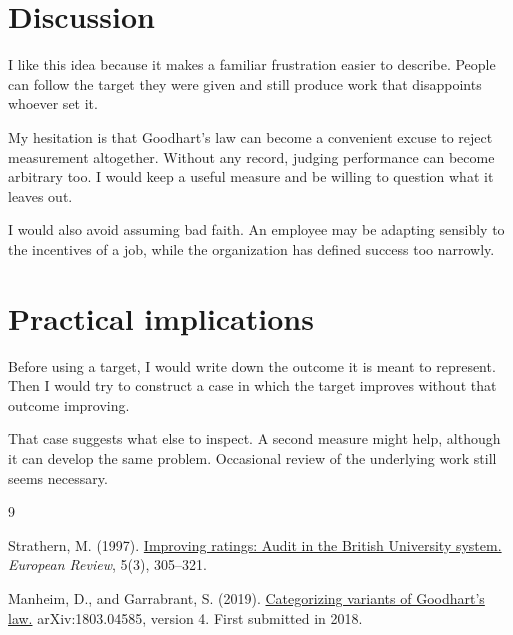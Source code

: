 \documentclass[11pt,a4paper]{article}
\begin{document}
\section{Discussion}

I like this idea because it makes a familiar frustration easier to
describe. People can follow the target they were given and still produce
work that disappoints whoever set it.

My hesitation is that Goodhart's law can become a convenient excuse to
reject measurement altogether. Without any record, judging performance
can become arbitrary too. I would keep a useful measure and be willing
to question what it leaves out.

I would also avoid assuming bad faith. An employee may be adapting
sensibly to the incentives of a job, while the organization has defined
success too narrowly.

\section{Practical implications}

Before using a target, I would write down the outcome it is meant to
represent. Then I would try to construct a case in which the target
improves without that outcome improving.

That case suggests what else to inspect. A second measure might help,
although it can develop the same problem. Occasional review of the
underlying work still seems necessary.

\renewcommand{\refname}{References}
\begin{thebibliography}{9}
\small
\setlength{\itemsep}{0.35em}

Strathern, M. (1997).
\href{https://www.cambridge.org/core/journals/european-review/article/improving-ratings-audit-in-the-british-university-system/FC2EE640C0C44E3DB87C29FB666E9AAB}
{Improving ratings: Audit in the British University system.}
\textit{European Review}, 5(3), 305--321.

Manheim, D., and Garrabrant, S. (2019).
\href{https://arxiv.org/abs/1803.04585}
{Categorizing variants of Goodhart's law.}
arXiv:1803.04585, version 4. First submitted in 2018.

\end{thebibliography}
\end{document}
